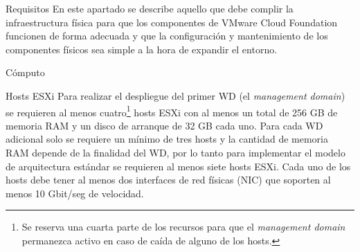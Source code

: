 \begin{section}{Requisitos}
En este apartado se describe aquello que debe complir la infraestructura física para que los componentes de VMware Cloud Foundation funcionen de forma adecuada y que la configuración y mantenimiento de los componentes físicos sea simple a la hora de expandir el entorno.

\begin{subsection}{Cómputo}
\begin{subsubsection}{Hosts ESXi}
    Para realizar el despliegue del primer WD (el \textit{management domain}) se requieren al menos cuatro\footnote{Se reserva una cuarta parte de los recursos para que el \textit{management domain} permanezca activo en caso de caída de alguno de los hosts.} hosts ESXi con al menos un total de 256 GB de memoria RAM y un disco de arranque de 32 GB cada uno. Para cada WD adicional solo se requiere un mínimo de tres hosts y la cantidad de memoria RAM depende de la finalidad del WD, por lo tanto para implementar el modelo de arquitectura estándar se requieren al menos siete hosts ESXi. Cada uno de los hosts debe tener al menos dos interfaces de red físicas (NIC) que soporten al menos 10 Gbit/seg de velocidad.
    

\end{subsubsection}
\end{subsection}
\end{section}
